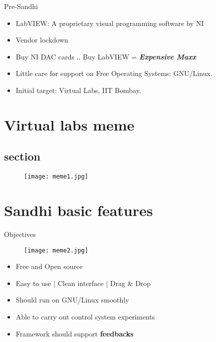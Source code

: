 \documentclass{beamer}
\begin{document}
\begin{frame}{Pre-Sandhi}

\begin{itemize}
  \item LabVIEW: A proprietary visual programming software by NI
  \item Vendor lockdown 
  \item Buy NI DAC cards .. Buy LabVIEW  = \textbf{ \textit{Expensive Maxx}}
  \item Little care for support on Free Operating Systems: GNU/Linux.
  \item Initial target: Virtual Labs, IIT Bombay.
\end{itemize}
\vskip 1cm
\end{frame}

\section{Virtual labs meme}
\vskip 1cm
\begin{frame}{}
\subsection{section}
\begin{figure} [ht!]
	\centering
	\texttt{[image: meme1.jpg]}
\end{figure}
\end{frame}

\section{Sandhi basic features}
\begin{frame}{Objectives}
\begin{figure} [ht!]
	\centering
	\texttt{[image: meme2.jpg]}
\end{figure}

\begin{itemize}
  \item Free and Open source
  \item Easy to use | Clean interface | Drag \& Drop 
  \item Should run on GNU/Linux smoothly
  \item Able to carry out control system experiments
  \item Framework should support \textbf{feedbacks}
\end{itemize}
\vskip 1cm
\end{frame}
\end{document}

